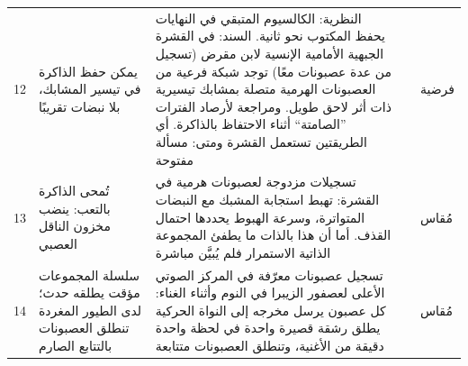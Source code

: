 {\begin{longtable}{>{\raggedright}p{0.5cm}>{\raggedright}p{4.0cm}>{\raggedright}p{5.6cm}>{\raggedright}p{2.3cm}>{\raggedright\arraybackslash}p{1.7cm}}
12 & يمكن حفظ الذاكرة في تيسير المشابك، بلا نبضات تقريبًا & النظرية: الكالسيوم المتبقي في النهايات يحفظ المكتوب نحو ثانية. السند: في القشرة الجبهية الأمامية الإنسية لابن مقرض (تسجيل من عدة عصبونات معًا) توجد شبكة فرعية من العصبونات الهرمية متصلة بمشابك تيسيرية ذات أثر لاحق طويل. ومراجعة لأرصاد الفترات ”الصامتة“ أثناء الاحتفاظ بالذاكرة. أي الطريقتين تستعمل القشرة ومتى: مسألة مفتوحة & \cite{Mongillo2008,WangMarkram2006,Stokes2015} & فرضية \\
13 & تُمحى الذاكرة بالتعب: ينضب مخزون الناقل العصبي & تسجيلات مزدوجة لعصبونات هرمية في القشرة: تهبط استجابة المشبك مع النبضات المتواترة، وسرعة الهبوط يحددها احتمال القذف. أما أن هذا بالذات ما يطفئ المجموعة الذاتية الاستمرار فلم يُبيَّن مباشرة & \cite{Tsodyks1997} & مُقاس \\
14 & سلسلة المجموعات مؤقت يطلقه حدث؛ لدى الطيور المغردة تنطلق العصبونات بالتتابع الصارم & تسجيل عصبونات معرّفة في المركز الصوتي الأعلى لعصفور الزيبرا في النوم وأثناء الغناء: كل عصبون يرسل مخرجه إلى النواة الحركية يطلق رشقة قصيرة واحدة في لحظة واحدة دقيقة من الأغنية، وتنطلق العصبونات متتابعة & \cite{Hahnloser2002} & مُقاس \\
\bottomrule
\end{longtable}}

